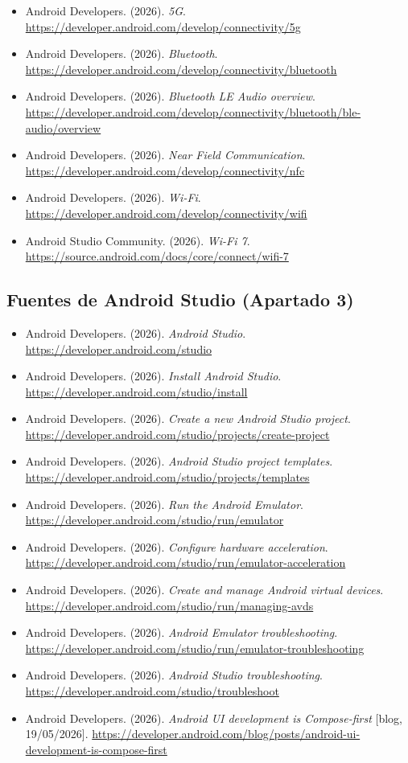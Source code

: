 {\begin{itemize}[leftmargin=*,itemsep=0.1em,label={}]
  \item Android Developers. (2026). \emph{5G}. \url{https://developer.android.com/develop/connectivity/5g}
  \item Android Developers. (2026). \emph{Bluetooth}. \url{https://developer.android.com/develop/connectivity/bluetooth}
  \item Android Developers. (2026). \emph{Bluetooth LE Audio overview}. \url{https://developer.android.com/develop/connectivity/bluetooth/ble-audio/overview}
  \item Android Developers. (2026). \emph{Near Field Communication}. \url{https://developer.android.com/develop/connectivity/nfc}
  \item Android Developers. (2026). \emph{Wi-Fi}. \url{https://developer.android.com/develop/connectivity/wifi}
  \item Android Studio Community. (2026). \emph{Wi-Fi 7}. \url{https://source.android.com/docs/core/connect/wifi-7}
\end{itemize}
}

\subsection*{Fuentes de Android Studio (Apartado 3)}
{\small
\begin{itemize}[leftmargin=*,itemsep=0.1em,label={}]
  \item Android Developers. (2026). \emph{Android Studio}. \url{https://developer.android.com/studio}
  \item Android Developers. (2026). \emph{Install Android Studio}. \url{https://developer.android.com/studio/install}
  \item Android Developers. (2026). \emph{Create a new Android Studio project}. \url{https://developer.android.com/studio/projects/create-project}
  \item Android Developers. (2026). \emph{Android Studio project templates}. \url{https://developer.android.com/studio/projects/templates}
  \item Android Developers. (2026). \emph{Run the Android Emulator}. \url{https://developer.android.com/studio/run/emulator}
  \item Android Developers. (2026). \emph{Configure hardware acceleration}. \url{https://developer.android.com/studio/run/emulator-acceleration}
  \item Android Developers. (2026). \emph{Create and manage Android virtual devices}. \url{https://developer.android.com/studio/run/managing-avds}
  \item Android Developers. (2026). \emph{Android Emulator troubleshooting}. \url{https://developer.android.com/studio/run/emulator-troubleshooting}
  \item Android Developers. (2026). \emph{Android Studio troubleshooting}. \url{https://developer.android.com/studio/troubleshoot}
  \item Android Developers. (2026). \emph{Android UI development is Compose-first} [blog, 19/05/2026]. \url{https://developer.android.com/blog/posts/android-ui-development-is-compose-first}
\end{itemize}
}

